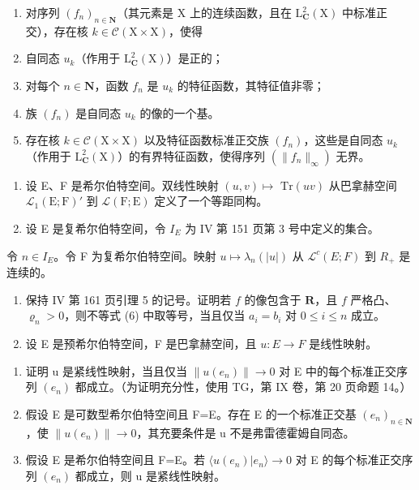 \begin{enumerate}
\def\labelenumi{\alph{enumi})}
\item
  对序列 \((f_n)_{n\in \mathbf{N}}\)（其元素是 X 上的连续函数，且在 \(\mathrm{L}_{\mathbf{C}}^2 (\mathrm{X})\) 中标准正交），存在核 \(k\in \mathcal{C}(\mathrm{X}\times \mathrm{X})\)，使得
\item
  自同态 \(u_{k}\)（作用于 \(\mathrm{L}_{\mathbf{C}}^{2}(\mathrm{X})\)）是正的；
\item
  对每个 \(n \in \mathbf{N}\)，函数 \(f_n\) 是 \(u_k\) 的特征函数，其特征值非零；
\item
  族 \((f_n)\) 是自同态 \(u_k\) 的像的一个基。
\item
  存在核 \(k \in \mathcal{C}(\mathrm{X} \times \mathrm{X})\) 以及特征函数标准正交族 \((f_n)\)，这些是自同态 \(u_k\)（作用于 \(\mathrm{L}_{\mathbf{C}}^2(\mathrm{X})\)）的有界特征函数，使得序列 \((\|f_n\|_\infty)\) 无界。
\end{enumerate}

\begin{enumerate}
\def\labelenumi{\arabic{enumi})}
\setcounter{enumi}{16}
\item
  设 E、F 是希尔伯特空间。双线性映射 \((u,v)\mapsto\) \(\mathrm{Tr}(uv)\) 从巴拿赫空间 \(\mathcal{L}_1(\mathrm{E};\mathrm{F})'\) 到 \(\mathcal{L}(\mathrm{F};\mathrm{E})\) 定义了一个等距同构。
\item
  设 E 是复希尔伯特空间，令 \(I_{E}\) 为 IV 第 151 页第 3 号中定义的集合。
\end{enumerate}

令 \(n \in I_{E}\)。令 F 为复希尔伯特空间。映射 \(u \mapsto \lambda_{n}(|u|)\) 从 \(\mathcal{L}^{c}(E;F)\) 到 \(R_{+}\) 是连续的。

\begin{enumerate}
\def\labelenumi{\arabic{enumi})}
\setcounter{enumi}{18}
\item
  保持 IV 第 161 页引理 5 的记号。证明若 \(f\) 的像包含于 \(\mathbf{R}\)，且 \(f\) 严格凸、\(\varrho_n > 0\)，则不等式 (6) 中取等号，当且仅当 \(a_i = b_i\) 对 \(0 \leqslant i \leqslant n\) 成立。
\item
  设 E 是预希尔伯特空间，F 是巴拿赫空间，且 \(u: E \to F\) 是线性映射。
\end{enumerate}

\begin{enumerate}
\def\labelenumi{\alph{enumi})}
\item
  证明 u 是紧线性映射，当且仅当 \(\|u(e_{n})\|\to0\) 对 E 中的每个标准正交序列 \((e_{n})\) 都成立。（为证明充分性，使用 TG，第 IX 卷，第 20 页命题 14。）
\item
  假设 E 是可数型希尔伯特空间且 F=E。存在 E 的一个标准正交基 \((e_{n})_{n\in\mathbf{N}}\)，使 \(\|u(e_{n})\|\to0\)，其充要条件是 u 不是弗雷德霍姆自同态。
\item
  假设 E 是希尔伯特空间且 F=E。若 \(\langle u(e_{n}) | e_{n} \rangle \to 0\) 对 E 的每个标准正交序列 \((e_{n})\) 都成立，则 u 是紧线性映射。
\end{enumerate}

